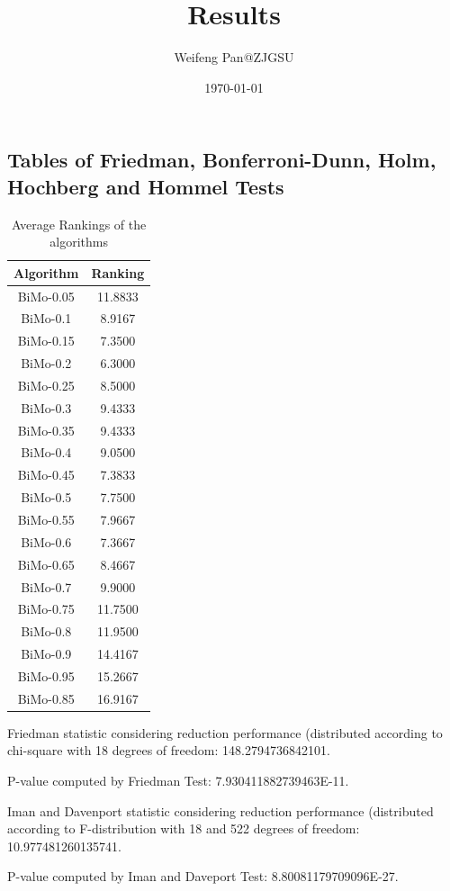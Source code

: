 \documentclass[a4paper,10pt]{article}
\title{Results}
\author{Weifeng Pan@ZJGSU}
\date{\today}
\begin{document}
\begin{landscape}
\oddsidemargin 0in \topmargin 0in\maketitle
\section{Tables of Friedman, Bonferroni-Dunn, Holm, Hochberg and Hommel Tests}
\begin{table}[!htp]
\centering
\caption{Average Rankings of the algorithms
}\begin{tabular}{c|c}
Algorithm&Ranking\\
\hline
BiMo-0.05&11.8833\\
BiMo-0.1&8.9167\\
BiMo-0.15&7.3500\\
BiMo-0.2&6.3000\\
BiMo-0.25&8.5000\\
BiMo-0.3&9.4333\\
BiMo-0.35&9.4333\\
BiMo-0.4&9.0500\\
BiMo-0.45&7.3833\\
BiMo-0.5&7.7500\\
BiMo-0.55&7.9667\\
BiMo-0.6&7.3667\\
BiMo-0.65&8.4667\\
BiMo-0.7&9.9000\\
BiMo-0.75&11.7500\\
BiMo-0.8&11.9500\\
BiMo-0.9&14.4167\\
BiMo-0.95&15.2667\\
BiMo-0.85&16.9167\\
\end{tabular}
\end{table}


Friedman statistic considering reduction performance (distributed according to chi-square with 18 degrees of freedom: 148.2794736842101.


P-value computed by Friedman Test: 7.930411882739463E-11.\newline

Iman and Davenport statistic considering reduction performance (distributed according to F-distribution with 18 and 522 degrees of freedom: 10.977481260135741.


P-value computed by Iman and Daveport Test: 8.80081179709096E-27.\newline


\end{landscape}
\end{document}
